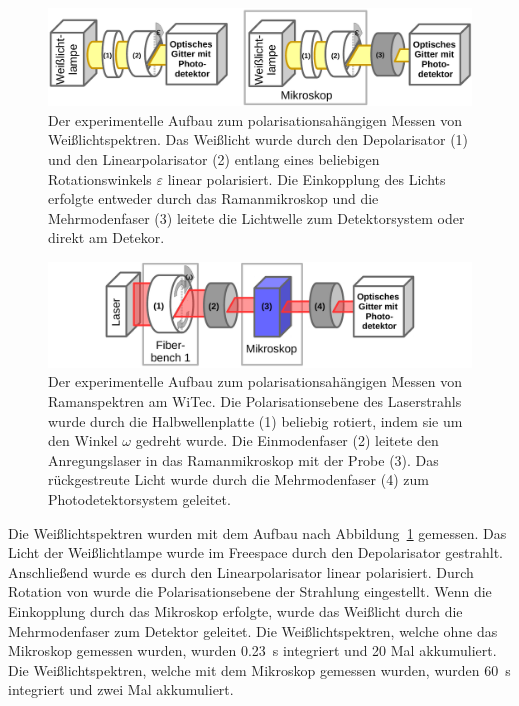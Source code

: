 \documentclass[a4paper,12pt,twoside,parskip=no,headsepline,open=right,ngerman,export]{scrreprt}
\begin{document}
            \begin{figure}[!b]
                \centering
                \includegraphics[width=\textwidth]{img/aufbau_weisslicht.pdf}
                \caption[Polarisationsabhängige Weißlichtspektren]{Der experimentelle Aufbau zum polarisationsahängigen Messen von Weißlichtspektren. Das Weißlicht wurde durch den Depolarisator (1) und den Linearpolarisator (2) entlang eines beliebigen Rotationswinkels $\varepsilon$ linear polarisiert. Die Einkopplung des Lichts erfolgte entweder durch das Ramanmikroskop und die Mehrmodenfaser  (3) leitete die Lichtwelle zum Detektorsystem oder direkt am Detekor.}
                \label{fig:method_weisslicht}
            \end{figure}
            
            
            \begin{figure}[!b]
                \centering
                \includegraphics[width=\textwidth]{img/aufbau_ramanspektren.pdf}
                \caption[Polarisationsabhängige Ramanspektren]{Der experimentelle Aufbau zum polarisationsahängigen Messen von Ramanspektren am WiTec. Die Polarisationsebene des Laserstrahls wurde durch die Halbwellenplatte (1) beliebig rotiert, indem sie um den Winkel $\omega$ gedreht wurde. Die Einmodenfaser  (2) leitete den Anregungslaser in das Ramanmikroskop mit der Probe (3). Das rückgestreute Licht wurde durch die Mehrmodenfaser  (4) zum Photodetektorsystem geleitet.}
                \label{fig:method_ramanspektrum}
            \end{figure}
            
            
            Die Weißlichtspektren wurden mit dem Aufbau nach Abbildung~\ref{fig:method_weisslicht} gemessen. Das Licht der Weißlichtlampe wurde im Freespace durch den Depolarisator  gestrahlt. Anschließend wurde es durch den Linearpolarisator  linear polarisiert. Durch Rotation von  wurde die Polarisationsebene der Strahlung eingestellt. Wenn die Einkopplung durch das Mikroskop erfolgte, wurde das Weißlicht durch die Mehrmodenfaser  zum Detektor geleitet. Die Weißlichtspektren, welche ohne das Mikroskop gemessen wurden, wurden \SI{0,23}{\second} integriert und \num{20} Mal akkumuliert. Die Weißlichtspektren, welche mit dem Mikroskop gemessen wurden, wurden \SI{60}{\second} integriert und zwei Mal akkumuliert.
            
\end{document}
